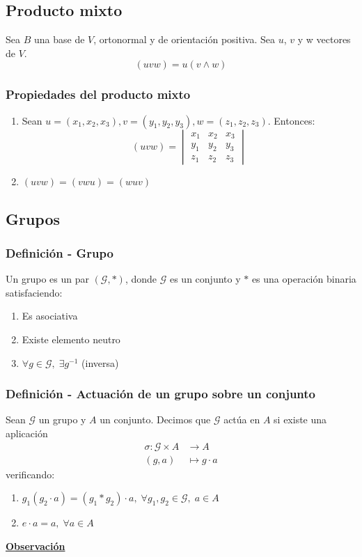 \documentclass[12pt, a4paper, ones, notitlepage, openany,titlepage]{article}
\newcommand{\observacion}{\noindent\underline{\textbf{Observación}}}
\begin{document}
\subsection{Producto mixto}
\noindent Sea $B$ una base de $V$, ortonormal y de orientación positiva. Sea $u$, $v$ y w vectores de $V$.
$$
(uvw) = u(v \wedge w)
$$

\subsubsection{Propiedades del producto mixto}
\begin{enumerate}
	\item Sean $u = (x_1, x_2, x_3), v = (y_1, y_2, y_3), w = (z_1, z_2, z_3)$. Entonces:\\
	$$
	(uvw) =
	\begin{vmatrix}
		x_1 & x_2 & x_3 \\
		y_1 & y_2 & y_3 \\
		z_1 & z_2 & z_3
	\end{vmatrix}
	$$
	\item $(uvw) = (vwu) = (wuv)$
\end{enumerate}

\subsection{Grupos}

\subsubsection{Definición - Grupo}
Un grupo es un par $(\mathcal{G}, *)$, donde $\mathcal{G}$ es un conjunto y $*$ es una operación binaria satisfaciendo:
\begin{enumerate}
	\item Es asociativa
	\item Existe elemento neutro
	\item $\forall g \in \mathcal{G}, \; \exists g^{-1}$ (inversa)
\end{enumerate}

\subsubsection{Definición - Actuación de un grupo sobre un conjunto}
Sean $\mathcal{G}$ un grupo y $A$ un conjunto. Decimos que $\mathcal{G}$ actúa en $A$ si existe una aplicación
$$
\begin{aligned}
	\sigma: \mathcal{G} \times A & \longrightarrow A \\
	(g, a) & \longmapsto g \cdot a
\end{aligned}
$$
verificando:
\begin{enumerate}
	\item $g_1(g_2 \cdot a) = (g_1 * g_2) \cdot a, \; \forall g_1, g_2 \in \mathcal{G}, \; a \in A$
	\item $e \cdot a = a, \; \forall a \in A$
\end{enumerate}
\observacion
\end{document}
